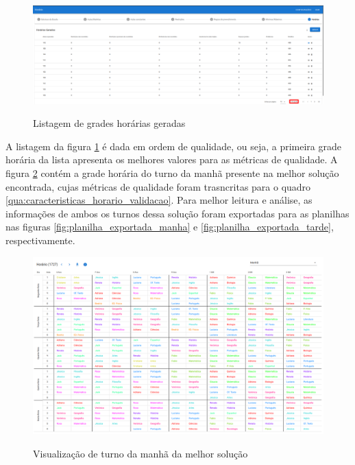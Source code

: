 \begin{figure}
	\centering
	\caption{Listagem de grades horárias geradas}
	\includegraphics[width=1\textwidth]{./dados/figuras/horarios_gerados_validacao}
	\label{fig:horarios_gerados_validacao}
\end{figure}
\pagebreak

A listagem da figura \ref{fig:horarios_gerados_validacao} é dada em ordem de qualidade, ou seja, a primeira grade horária da lista apresenta os melhores valores para as métricas de qualidade. A figura \ref{fig:horario_exportado_manha} contém a grade horária do turno da manhã presente na melhor solução encontrada, cujas métricas de qualidade foram trasncritas para o quadro \ref{qua:caracteristicas_horario_validacao}. Para melhor leitura e análise, as informações de ambos os turnos dessa solução foram exportadas para as planilhas nas figuras \ref{fig:planilha_exportada_manha} e \ref{fig:planilha_exportada_tarde}, respectivamente.

\begin{figure}
	\centering
	\caption{Visualização de turno da manhã da melhor solução}
	\includegraphics[width=1\textwidth]{./dados/figuras/horario_exportado_manha}
	\label{fig:horario_exportado_manha}
\end{figure}


